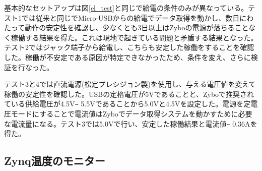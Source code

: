 基本的なセットアップは図\ref{el_test}と同じで給電の条件のみが異なっている。テスト1では従来と同じでMicro-USBからの給電でデータ取得を動かし、数日にわたって動作の安定性を確認し、少なくとも3日以上はZyboの電源が落ちることなく稼働する結果を得た。これは現地で起きている問題と矛盾する結果となった。テスト2ではジャック端子から給電し、こちらも安定した稼働をすることを確認した。稼働が不安定である原因が特定できなかったため、条件を変え、さらに検証を行なった。

テスト3と4では直流電源(松定プレシジョン製)を使用し、与える電圧値を変えて稼働の安定性を確認した。USBの定格電圧が5Vであることと、Zyboで推奨されている供給電圧が4.5V\verb|~| 5.5Vであることから5.0Vと4.5Vを設定した。電源を定電圧モードにすることで電流値はZyboでデータ取得システムを動かすために必要な電流量になる。テスト3では5.0Vで行い、安定した稼働結果と電流値\verb|~| 0.36Aを得た。

\subsection{Zynq温度のモニター}

